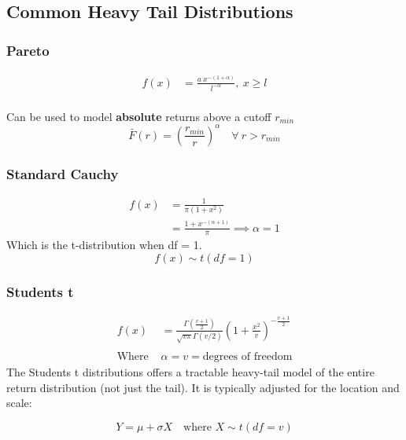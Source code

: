 \documentclass[
  oneside]{book}
\begin{document}
\hypertarget{common-heavy-tail-distributions}{%
\subsection{Common Heavy Tail Distributions}\label{common-heavy-tail-distributions}}

\hypertarget{pareto}{%
\subsubsection{Pareto}\label{pareto}}

\[
\begin{aligned}
f(x) &= \frac{a\ x^{-(1+\alpha)}}{l^{-\alpha}}, \ x \geq l\\
\end{aligned}
\]

Can be used to model \textbf{absolute} returns above a cutoff \(r_{min}\)
\[
\bar{F}(r) = \left( \frac{r_{min}}{r} \right)^{\alpha} \quad \forall\ r > r_{min}
\]

\hypertarget{standard-cauchy}{%
\subsubsection{Standard Cauchy}\label{standard-cauchy}}

\[
\begin{aligned}
f(x) &= \frac{1}{\pi(1+x^{2})}\\
&= \frac{1+x^{-(\alpha+1)}}{\pi}  \implies \alpha = 1
\end{aligned}
\]
Which is the t-distribution when df = 1.
\[
f(x) \sim t(df=1)
\]

\hypertarget{students-t}{%
\subsubsection{Students t}\label{students-t}}

\[
\begin{aligned}
f(x) &= \frac{\Gamma\left( \frac{v+1}{2} \right)}{\sqrt{ v\pi }\Gamma(v/2)}\left( 1+\frac{x^{2}}{v} \right)^{-\frac{v+1}{2}}\\
\\
\text{Where } &\alpha = v = \text{degrees of freedom}
\end{aligned}
\]
The Students t distributions offers a tractable heavy-tail model of the entire return distribution (not just the tail). It is typically adjusted for the location and scale:

\[
Y = \mu + \sigma X \quad \text{where } X \sim t(df=v)
\]
\end{document}
